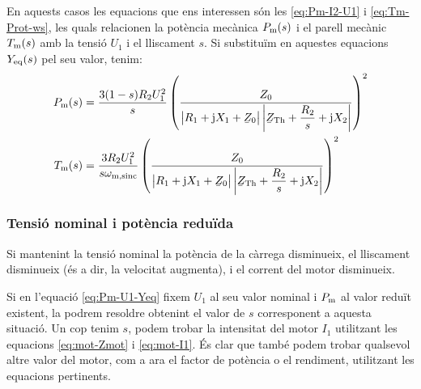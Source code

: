 En aquests casos les equacions que ens interessen són les \eqref{eq:Pm-I2-U1} i \eqref{eq:Tm-Prot-ws}, les quals relacionen la potència mecànica $P_\mathrm{m}(s)$ i el parell mecànic $T_\mathrm{m}(s)$ amb la tensió $U_1$ i el lliscament $s$. Si substituïm en aquestes equacions $Y_\mathrm{eq}(s)$ pel seu valor, tenim:
\begin{subequations}
	\begin{align}
	P\ped{m}(s) &= \frac{3(1-s) R_2 U_1^2}{s} \left( \frac{Z_0}{\big|R_1 + \ju X_1 + \cmplx{Z}_0\big| \left|\cmplx{Z}\ped{Th} + \dfrac{R_2}{s} + \ju X_2\right|} \right)^2 \label{eq:Pm-U1-Yeq} \\
	T\ped{m}(s) &= \frac{3 R_2 U_1^2}{s\omega\ped{m,sinc}}  \left( \frac{Z_0}{\big|R_1 + \ju X_1 + \cmplx{Z}_0\big| \left|\cmplx{Z}\ped{Th} + \dfrac{R_2}{s} + \ju X_2\right|} \right)^2\label{eq:Tm-U1-Yeq}
	\end{align}
\end{subequations}

	
\subsubsection{Tensió nominal i potència reduïda}	

Si mantenint la tensió nominal la potència de la càrrega disminueix, el lliscament disminueix (és a dir, la velocitat augmenta), i el corrent del motor disminueix.
	
Si en l'equació \eqref{eq:Pm-U1-Yeq} fixem $U_1$ al seu valor nominal i  $P_\mathrm{m}$ al  valor reduït existent,  la podrem resoldre obtenint el valor de $s$ corresponent  a aquesta situació. Un cop tenim $s$, podem trobar la intensitat del motor $I_1$ utilitzant les equacions \eqref{eq:mot-Zmot} i \eqref{eq:mot-I1}. És clar que també podem trobar qualsevol altre valor del motor, com a ara el factor de potència o el rendiment, utilitzant les equacions pertinents.


